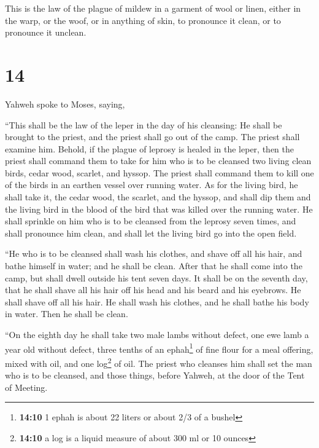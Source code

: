  This is the law of the plague of mildew in a garment of
wool or linen, either in the warp, or the woof, or in anything of skin,
to pronounce it clean, or to pronounce it unclean.

\hypertarget{section-13}{%
\section{14}\label{section-13}}

 Yahweh spoke to Moses, saying,

 ``This shall be the law of the leper in the day of his
cleansing: He shall be brought to the priest,  and the
priest shall go out of the camp. The priest shall examine him. Behold,
if the plague of leprosy is healed in the leper,  then the
priest shall command them to take for him who is to be cleansed two
living clean birds, cedar wood, scarlet, and hyssop.  The
priest shall command them to kill one of the birds in an earthen vessel
over running water.  As for the living bird, he shall take
it, the cedar wood, the scarlet, and the hyssop, and shall dip them and
the living bird in the blood of the bird that was killed over the
running water.  He shall sprinkle on him who is to be
cleansed from the leprosy seven times, and shall pronounce him clean,
and shall let the living bird go into the open field.

 ``He who is to be cleansed shall wash his clothes, and
shave off all his hair, and bathe himself in water; and he shall be
clean. After that he shall come into the camp, but shall dwell outside
his tent seven days.  It shall be on the seventh day, that
he shall shave all his hair off his head and his beard and his eyebrows.
He shall shave off all his hair. He shall wash his clothes, and he shall
bathe his body in water. Then he shall be clean.

 ``On the eighth day he shall take two male lambs without
defect, one ewe lamb a year old without defect, three tenths of an
ephah\footnote{\textbf{14:10} 1 ephah is about 22 liters or about 2/3 of
  a bushel} of fine flour for a meal offering, mixed with oil, and one
log\footnote{\textbf{14:10} a log is a liquid measure of about 300 ml or
  10 ounces} of oil.  The priest who cleanses him shall
set the man who is to be cleansed, and those things, before Yahweh, at
the door of the Tent of Meeting.

